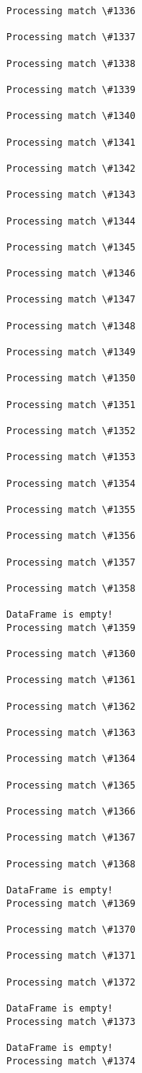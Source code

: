 \documentclass[11pt]{article}
\begin{document}
\begin{Verbatim}[commandchars=\\\{\}]
Processing match \#1336

Processing match \#1337

Processing match \#1338

Processing match \#1339

Processing match \#1340

Processing match \#1341

Processing match \#1342

Processing match \#1343

Processing match \#1344

Processing match \#1345

Processing match \#1346

Processing match \#1347

Processing match \#1348

Processing match \#1349

Processing match \#1350

Processing match \#1351

Processing match \#1352

Processing match \#1353

Processing match \#1354

Processing match \#1355

Processing match \#1356

Processing match \#1357

Processing match \#1358

DataFrame is empty!
Processing match \#1359

Processing match \#1360

Processing match \#1361

Processing match \#1362

Processing match \#1363

Processing match \#1364

Processing match \#1365

Processing match \#1366

Processing match \#1367

Processing match \#1368

DataFrame is empty!
Processing match \#1369

Processing match \#1370

Processing match \#1371

Processing match \#1372

DataFrame is empty!
Processing match \#1373

DataFrame is empty!
Processing match \#1374


\end{Verbatim}
\end{document}
